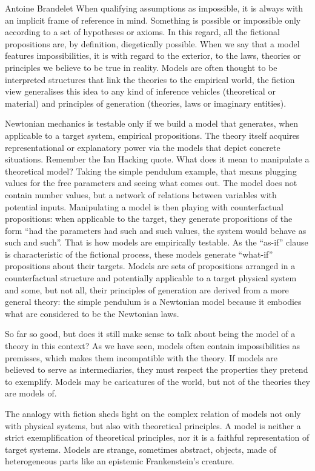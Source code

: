 \begin{artengenv}{Antoine Brandelet}
When qualifying assumptions as impossible, it is always with an implicit frame of reference in mind. Something is possible or impossible only according to a set of hypotheses or axioms. In this regard, all the fictional propositions are, by definition, diegetically possible. When we say that a model features impossibilities, it is with regard to the exterior, to the laws, theories or principles we believe to be true in reality. Models are often thought to be interpreted structures that link the theories to the empirical world, the fiction view generalises this idea to any kind of inference vehicles (theoretical or material) and principles of generation (theories, laws or imaginary entities).

Newtonian mechanics is testable only if we build a model that generates, when applicable to a target system, empirical propositions. The theory itself acquires representational or explanatory power via the models that depict concrete situations. Remember the Ian Hacking quote. What does it mean to manipulate a theoretical model? Taking the simple pendulum example, that means plugging values for the free parameters and seeing what comes out. The model does not contain number values, but a network of relations between variables with potential inputs. Manipulating a model is then playing with counterfactual propositions: when applicable to the target, they generate propositions of the form ``had the parameters had such and such values, the system would behave as such and such''. That is how models are empirically testable. As the ``as-if'' clause is characteristic of the fictional process, these models generate ``what-if'' propositions about their targets. Models are sets of propositions arranged in a counterfactual structure and potentially applicable to a target physical system and some, but not all, their principles of generation are derived from a more general theory: the simple pendulum is a Newtonian model because it embodies what are considered to be the Newtonian laws.

So far so good, but does it still make sense to talk about being the model of a theory in this context? As we have seen, models often contain impossibilities as premisses, which makes them incompatible with the theory. If models are believed to serve as intermediaries, they must respect the properties they pretend to exemplify. Models may be caricatures of the world, but not of the theories they are models of.

The analogy with fiction sheds light on the complex relation of models not only with physical systems, but also with theoretical principles. A model is neither a strict exemplification of theoretical principles, nor it is a faithful representation of target systems. Models are strange, sometimes abstract, objects, made of heterogeneous parts like an epistemic Frankenstein's creature.


\end{artengenv}
